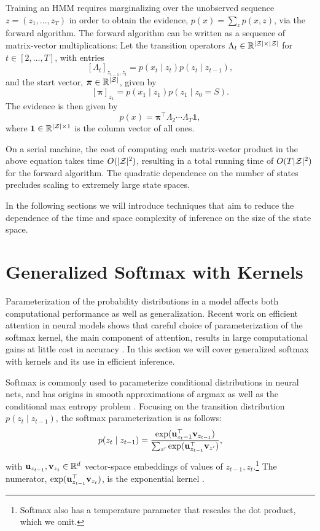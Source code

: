 \documentclass{article}
\begin{document}
Training an HMM requires marginalizing over the unobserved
sequence $z = (z_1,\ldots,z_T)$ in order to obtain the evidence, $p(x) = \sum_z p(x,z)$,
via the forward algorithm.
The forward algorithm can be written as a sequence of matrix-vector multiplications:
Let the transition operators $\Lambda_t\in\mathbb{R}^{|\mathcal{Z}|\times|\mathcal{Z}|}$ for $t\in[2,\ldots,T]$, 
with entries
\begin{equation}
\label{eqn:trans}
[\Lambda_t]_{z_{t-1},z_{t}} = p(x_t\mid z_t)p(z_t\mid z_{t-1}),
\end{equation}
and the start vector, $\bm\pi\in\mathbb{R}^{|\mathcal{Z}|}$, given by
\begin{equation}
\label{eqn:start}
[\bm\pi]_{z_1} = p(x_1 \mid z_1) p(z_1 \mid z_0=S).
\end{equation}
The evidence is then given by
\begin{equation}
\label{eqn:evidence}
p(x) = \bm\pi^\top\Lambda_2\cdots\Lambda_T\mathbf{1},
\end{equation}
where $\mathbf{1}\in\mathbb{R}^{|\mathcal{Z}|\times1}$ is the column vector of all ones.

On a serial machine, the cost of computing each matrix-vector product in
the above equation takes time $O(|\mathcal{Z}|^2)$, resulting in a total
running time of $O(T|\mathcal{Z}|^2)$ for the forward algorithm.
The quadratic dependence on the number of states precludes
scaling to extremely large state spaces.

In the following sections we will introduce techniques that
aim to reduce the dependence of the time and space complexity
of inference on the size of the state space.

\section{Generalized Softmax with Kernels}
Parameterization of the probability distributions in a model affects both
computational performance as well as generalization.
Recent work on efficient attention in neural models shows that careful choice of parameterization
of the softmax kernel, the main component of attention,
results in large computational gains at little cost in accuracy
\citep{choromanski2020performer,peng2021rfa}.
In this section we will cover generalized softmax with kernels and 
its use in efficient inference.

Softmax is commonly used to parameterize conditional distributions in
neural nets, and has origins in smooth
approximations of argmax as well as the conditional max entropy problem \citep{}.
Focusing on the transition distribution $p(z_t \mid z_{t-1})$,
the softmax parameterization is as follows: 
\begin{equation*}
p(z_t \mid z_{t-1}) = \frac{\exp(\mathbf{u}_{z_t-1}^\top \mathbf{v}_{z_{t-1}})}
{\sum_{z'} \exp(\mathbf{u}_{z_{t-1}}^\top \mathbf{v}_{z'})},
\end{equation*}
with $\mathbf{u}_{z_{t-1}},\mathbf{v}_{z_t}\in\mathbb{R}^d$ vector-space embeddings of values of
$z_{t-1},z_{t}$.\footnote{
Softmax also has a temperature parameter that rescales 
the dot product, which we omit.
}
The numerator, $\exp(\mathbf{u}_{z_{t-1}}^\top \mathbf{v}_{z_t})$,
is the exponential kernel \citep{rawat2019sampledsoftmax}.
\end{document}
